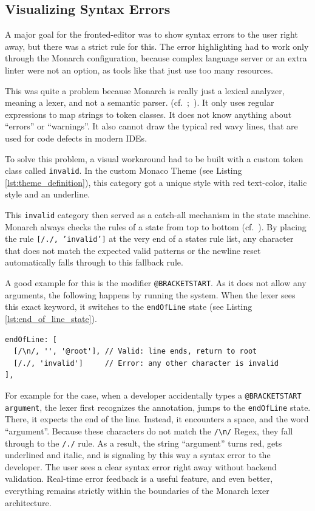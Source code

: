 \subsection{Visualizing Syntax Errors}

A major goal for the fronted-editor was to show syntax errors to the user right away, but there was a strict rule for this. The error highlighting had to work only through the Monarch configuration, because complex language server or an extra linter were not an option, as tools like that just use too many resources.

This was quite a problem because Monarch is really just a lexical analyzer, meaning a lexer, and not a semantic parser. (cf.~\cite{MonacoMonarchDocs};~\cite[pp.~5-8]{Aho2006}). It only uses regular expressions to map strings to token classes. It does not know anything about ``errors'' or ``warnings''. It also cannot draw the typical red wavy lines, that are used for code defects in modern IDEs.

To solve this problem, a visual workaround had to be built with a custom token class called \texttt{invalid}. In the custom Monaco Theme (see Listing \ref{lst:theme_definition}), this category got a unique style with red text-color,  italic style and an underline.

This \texttt{invalid} category then served as a catch-all mechanism in the state machine. Monarch always checks the rules of a state from top to bottom (cf.~\cite{MonacoMonarchDocs}). By placing the rule \texttt{[/./, 'invalid']} at the very end of a states rule list, any character that does not match the expected valid patterns or the newline reset automatically falls through to this fallback rule.

A good  example for this is the modifier \texttt{@BRACKETSTART}. As it does not allow any arguments, the following happens by running the system. When the lexer sees this exact keyword, it switches to the \texttt{endOfLine} state (see Listing \ref{lst:end_of_line_state}).

\begin{lstlisting}[caption={The \texttt{endOfLine} state}, label={lst:end_of_line_state}]
endOfLine: [
  [/\n/, '', '@root'], // Valid: line ends, return to root
  [/./, 'invalid']     // Error: any other character is invalid
],
\end{lstlisting}

For example for the case, when a developer accidentally types a  \texttt{@BRACKETSTART argument}, the lexer first recognizes the annotation, jumps to the \texttt{endOfLine} state. There, it expects the end of the line. Instead, it encounters a space, and the word ``argument''. Because these characters do not match the \texttt{/\textbackslash n/} Regex, they fall through to the \texttt{/./} rule. As a result, the string ``argument'' turns red, gets underlined and italic, and is signaling by this way a  syntax error to the developer.  The user sees a clear syntax error right away without backend validation. Real-time error feedback is a useful feature, and even better, everything remains strictly within the boundaries of the Monarch lexer architecture.

